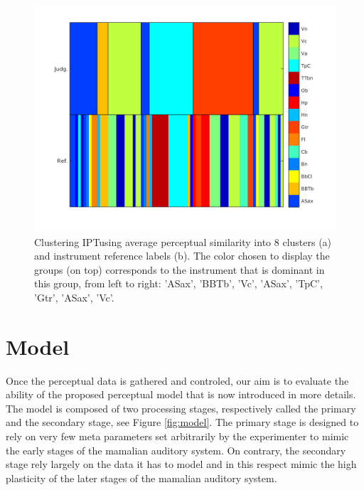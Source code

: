 \documentclass{article}
\newcommand{\ipt}{IPT}
\begin{document}
\begin{figure}
\center
\includegraphics[width = \textwidth]{figures/groupInstruments.png}
\caption{Clustering \ipt using average perceptual similarity into 8 clusters (a) and instrument reference labels (b). The color chosen to display the groups (on top) corresponds  to the instrument that is dominant in this group, from left to right: 'ASax', 'BBTb', 'Vc', 'ASax', 'TpC', 'Gtr', 'ASax', 'Vc'.}
\label{fig:gi}
\end{figure}

\section{Model}\label{sec:model}

Once the perceptual data is gathered and controled, our aim is to evaluate the ability of the proposed perceptual model that is now introduced in more details. The model is composed of two processing stages, respectively called the primary and the secondary stage, see Figure \ref{fig:model}. The primary stage is designed to rely on very few meta parameters set arbitrarily by the experimenter to mimic the early stages of the mamalian auditory system. On contrary, the secondary stage rely largely on the data it has to model and in this respect mimic the high plasticity of the later stages of the mamalian auditory system.
\end{document}
